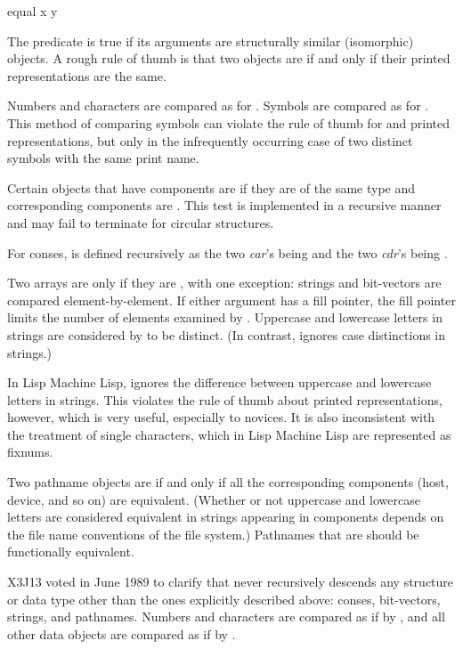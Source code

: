 \begin{defun}[Function]
equal x y

The  predicate is true if its arguments are structurally similar
(isomorphic) objects.  A rough rule of thumb is that two objects
are  if and only if their printed representations are the same.

Numbers and characters are compared as for .
Symbols are compared as for .  This method
of comparing symbols can violate the rule
of thumb for  and printed representations,
but only in the infrequently occurring case of two distinct
symbols with the same print name.

Certain objects that have components are  if they are of the same
type and corresponding components are .
This test is implemented in a recursive manner and may fail to
terminate for circular structures.

For conses,  is defined recursively as
the two {\it car}'s being  and the two {\it cdr}'s being .

Two arrays are  only if they are ,
with one exception:
strings and bit-vectors are compared element-by-element.
If either argument has a fill pointer, the fill pointer limits
the number of elements examined by .
Uppercase and lowercase letters in strings are considered by
 to be distinct.  (In contrast,  ignores
case distinctions in strings.)

\beforenoterule
\begin{incompatibility}
In Lisp Machine Lisp,  ignores the difference between
uppercase and lowercase letters in strings.
This violates the rule of thumb about
printed representations, however, which is very useful, especially
to novices.  It is also inconsistent with the treatment of single characters,
which in Lisp Machine Lisp are represented as fixnums.
\end{incompatibility}
\afternoterule

Two pathname objects are  if and only if
all the corresponding components
(host, device, and so on) are equivalent.  (Whether or not
uppercase and lowercase letters are considered equivalent
in strings appearing in components depends on the file
name conventions of the file system.)  Pathnames
that are  should be functionally equivalent.

\begin{new}
X3J13 voted in June 1989
to clarify that  never recursively
descends any structure or data type other than the ones explicitly
described above: conses, bit-vectors, strings, and pathnames.
Numbers and characters are compared as if by , and all other
data objects are compared as if by .
\end{new}


\end{defun}
